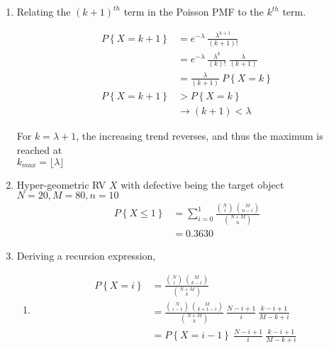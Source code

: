 \begin{enumerate}
	
	\item Relating the $ (k+1)^{th} $ term in the Poisson PMF to the $ k^{th} $ term.
	
		\begin{align}
			P \left\{X = k+1 \right\} &= e^{-\lambda}\ \frac{\lambda^{k+1}}{(k+1)!} \nonumber \\
			&= e^{-\lambda}\ \frac{\lambda^{k}}{(k)!}\ \frac{\lambda}{(k+1)} \\
			&= \frac{\lambda}{(k+1)}\ P \left\{X = k \right\} \nonumber \\
			P \left\{X = k+1 \right\} &> P \left\{X = k \right\} \nonumber \\
			&\to (k+1) < \lambda
		\end{align}
	 
	For $ k = \lambda + 1 $, the increasing trend reverses, and thus the maximum is reached at \\ $ k_{max} = \lfloor \lambda \rfloor $\\
	
	\item Hyper-geometric RV $ X $ with defective being the target object $ N = 20, M = 80, n = 10 $\\
	
		\begin{align}
			P \left\{X \leq 1 \right\} &= \sum\limits_{i = 0}^{1} \frac{\binom{N}{i}\ \binom{M}{n-i}}{\binom{N+M}{n}}\nonumber \\
			&= 0.3630
		\end{align}
	 
	
	\item Deriving a recursion expression,
	
		\begin{enumerate}
			\item \begin{align}
				P \left\{X = i\right\} &= \frac{\binom{N}{i}\ \binom{M}{k-i}}{\binom{N+M}{k}} \nonumber \\
				&= \frac{\binom{N}{i-1}\ \binom{M}{k+1-i}}{\binom{N+M}{k}}\ \frac{N-i+1}{i}\ \frac{k-i+1}{M-k+i} \nonumber \\
				&= P \left\{X = i-1\right\}\ \frac{N-i+1}{i}\ \frac{k-i+1}{M-k+i}  \\
			\end{align}
			

\end{enumerate}
\end{enumerate}
